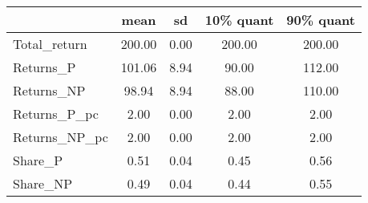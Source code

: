 \begin{tabular}{lcccc}
\toprule
{} &    mean &    sd &  10\% quant &  90\% quant \\
\midrule
Total\_return  &  200.00 &  0.00 &     200.00 &     200.00 \\
Returns\_P     &  101.06 &  8.94 &      90.00 &     112.00 \\
Returns\_NP    &   98.94 &  8.94 &      88.00 &     110.00 \\
Returns\_P\_pc  &    2.00 &  0.00 &       2.00 &       2.00 \\
Returns\_NP\_pc &    2.00 &  0.00 &       2.00 &       2.00 \\
Share\_P       &    0.51 &  0.04 &       0.45 &       0.56 \\
Share\_NP      &    0.49 &  0.04 &       0.44 &       0.55 \\
\bottomrule
\end{tabular}
